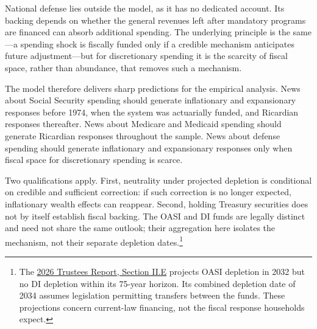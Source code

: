 \documentclass[12pt]{article}%
\theoremstyle{remark}
\begin{document}
National defense lies outside the model, as it has no dedicated account. Its
backing depends on whether the general revenues left after mandatory programs
are financed can absorb additional spending. The underlying principle is the
same---a spending shock is fiscally funded only if a credible mechanism
anticipates future adjustment---but for discretionary spending it is the scarcity
of fiscal space, rather than abundance, that removes such a mechanism.

The model therefore delivers sharp predictions for the empirical analysis. News about Social Security spending should generate inflationary and expansionary responses before 1974, when the system was actuarially funded, and Ricardian responses thereafter. News about Medicare and Medicaid spending should generate Ricardian responses throughout the sample. News about defense spending should generate inflationary and expansionary responses only when fiscal space for discretionary spending is scarce.


Two qualifications apply. First, neutrality under projected depletion is conditional on credible and sufficient correction: if such correction is no longer expected, inflationary wealth effects can reappear. Second, holding Treasury securities does not by itself establish fiscal backing. The OASI and DI funds are legally distinct and need not share the same outlook; their aggregation here isolates the mechanism, not their separate depletion dates.\footnote{The \href{https://www.ssa.gov/oact/tr/2026/II_E_conclu.html}{2026 Trustees Report, Section II.E} projects OASI depletion in 2032 but no DI depletion within its 75-year horizon. Its combined depletion date of 2034 assumes legislation permitting transfers between the funds. These projections concern current-law financing, not the fiscal response households expect.}

\end{document}
